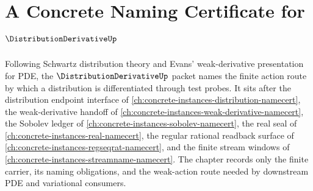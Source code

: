\chapter{A Concrete Naming Certificate for $\DistributionDerivativeUp$}
\label{ch:concrete-instances-distribution-derivative-namecert}

Following Schwartz distribution theory and Evans' weak-derivative presentation for PDE, the $\DistributionDerivativeUp$ packet names the finite action route by which a distribution is differentiated through test probes. It sits after the distribution endpoint interface of \autoref{ch:concrete-instances-distribution-namecert}, the weak-derivative handoff of \autoref{ch:concrete-instances-weak-derivative-namecert}, the Sobolev ledger of \autoref{ch:concrete-instances-sobolev-namecert}, the real seal of \autoref{ch:concrete-instances-real-namecert}, the regular rational readback surface of \autoref{ch:concrete-instances-regseqrat-namecert}, and the finite stream windows of \autoref{ch:concrete-instances-streamname-namecert}. The chapter records only the finite carrier, its naming obligations, and the weak-action route needed by downstream PDE and variational consumers.

